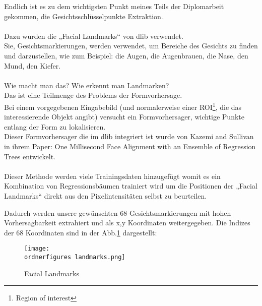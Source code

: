 Endlich ist es zu dem wichtigsten Punkt meines Teils der Diplomarbeit gekommen, die Gesichtsschlüsselpunkte Extraktion. \\\\
Dazu wurden die „Facial Landmarks“ von dlib verwendet. \\
Sie, Gesichtsmarkierungen, werden verwendet, um Bereiche des Gesichts zu finden und darzustellen, wie zum Beispiel: die Augen, die Augenbrauen, die Nase, den Mund, den Kiefer. \\\\
Wie macht man das? Wie erkennt man Landmarken? \\Das ist eine Teilmenge des Problems der Formvorhersage.\\ Bei einem vorgegebenen Eingabebild (und normalerweise einer ROI\footnote{Region of interest}, die das interessierende Objekt angibt) versucht ein Formvorhersager, wichtige Punkte entlang der Form zu lokalisieren. \\
Dieser Formvorhersager die im dlib integriert ist wurde von Kazemi and Sullivan in ihrem Paper: One Millisecond Face Alignment with an Ensemble of Regression Trees entwickelt. \\\\
Dieser Methode werden viele Trainingsdaten hinzugefügt womit es ein Kombination von Regressionsbäumen trainiert wird um die Positionen der „Facial Landmarks“ direkt aus den Pixelintensitäten selbst zu beurteilen. \\
\cite{Kazemi2014OneMF}

Dadurch werden unsere gewünschten 68 Gesichtsmarkierungen mit hohen Vorhersagbarkeit extrahiert und als x,y Koordinaten weitergegeben. 
Die Indizes der 68 Koordinaten sind in der Abb.\ref{fig:landmarks} dargestellt:\\




\begin{figure}[H]
	\texttt{[image: \\ordnerfigures landmarks.png]}
	\caption{Facial Landmarks}
	\label{fig:landmarks}
	\cite{Kazemi2014OneMF}
\end{figure}

